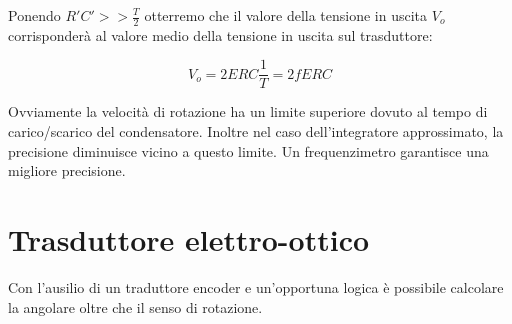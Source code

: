 Ponendo $R'C' >> \frac{T}{2}$ otterremo che il valore della tensione
in uscita $V_o$ corrisponderà al valore medio della tensione in
uscita sul trasduttore:

	\[ V_o = 2ERC\frac{1}{T} = 2fERC \]

Ovviamente la velocità di rotazione ha un limite superiore dovuto al
tempo di carico/scarico del condensatore. Inoltre nel caso
dell'integratore approssimato, la precisione diminuisce vicino a
questo limite. Un frequenzimetro garantisce una migliore precisione.

\section{Trasduttore elettro-ottico}
Con l'ausilio di un traduttore encoder e un'opportuna logica è
possibile calcolare la angolare oltre che il senso di rotazione.